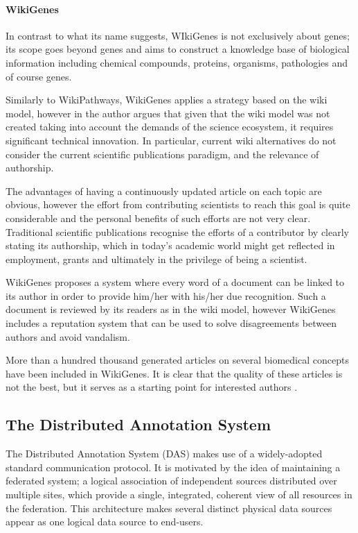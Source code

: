 \paragraph{WikiGenes}
In contrast to what its name suggests, WIkiGenes is not exclusively about genes; its scope goes beyond genes and aims to construct a knowledge base of biological information including chemical compounds, proteins, organisms, pathologies and of course genes. 

Similarly to WikiPathways, WikiGenes applies a strategy based on the wiki model, however in \cite{HOF2008} the author argues that given that the wiki model was not created taking into account the demands of the science ecosystem, it requires significant technical innovation. In particular, current wiki alternatives do not consider the current scientific publications paradigm, and the relevance of authorship. 

The advantages of having a continuously updated article on each topic are obvious, however the effort from contributing scientists to reach this goal is quite considerable and the personal benefits of such efforts are not very clear. Traditional scientific publications recognise the efforts of a contributor by clearly stating its authorship, which in today's academic world might get reflected in employment, grants and ultimately in the privilege of being a scientist.

WikiGenes proposes a system where every word of a document can be linked to its author in order to provide him/her with his/her due recognition. Such a document is reviewed by its readers as in the wiki model, however WikiGenes includes a reputation system that can be used to solve disagreements between authors and avoid vandalism.

More than a hundred thousand generated articles on several biomedical concepts have been included in WikiGenes. It is clear that the quality of these articles is not the best, but it serves as a starting point for interested authors \cite{HOF2008}.


\subsection{The Distributed Annotation System}
\label{ssec:DAS}
The Distributed Annotation System (DAS) \cite{DOW2001} makes use of a widely-adopted standard communication protocol. It is motivated by the idea of maintaining a federated system; a logical association of independent sources distributed over multiple sites, which provide a single, integrated, coherent view of all resources in the federation. This architecture makes several distinct physical data sources appear as one logical data source to end-users. 

